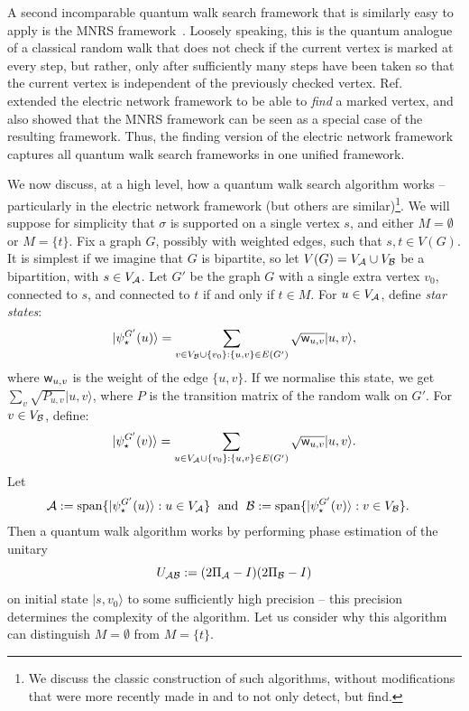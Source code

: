 \documentclass{article}
\def\ket#1{{\lvert}#1\rangle}
\renewcommand{\>}{\rangle}
\newcommand{\<}{\langle}
\renewcommand{\(}{\left(}
\renewcommand{\)}{\right)}
\def\w{{\sf w}}
\begin{document}
A second incomparable quantum walk search framework that is similarly easy to apply is the MNRS framework~\cite{magniez2006SearchQuantumWalk}. Loosely speaking, this is the quantum analogue of a classical random walk that does not check if the current vertex is marked at every step, but rather, only after sufficiently many steps have been taken so that the current vertex is independent of the previously checked vertex. Ref.~\cite{apers2019UnifiedFrameworkQWSearch} extended the electric network framework to be able to \emph{find} a marked vertex, and also showed that the MNRS framework can be seen as a special case of the resulting framework. Thus, the finding version of the electric network framework captures all quantum walk search frameworks in one unified framework. 

We now discuss, at a high level, how a quantum walk search algorithm works -- particularly in the electric network framework (but others are similar)\footnote{We discuss the classic construction of such algorithms, without modifications that were more recently made in \cite{ambainis2019QuadSpeedupFindingMarkedQW} and \cite{apers2019UnifiedFrameworkQWSearch} to not only detect, but find.}. We will suppose for simplicity that $\sigma$ is supported on a single vertex $s$, and either $M=\emptyset$ or $M=\{t\}$. 
Fix a graph $G$, possibly with weighted edges, such that $s,t\in V(G)$. It is simplest if we imagine that $G$ is bipartite, so let $V(G)=V_{\cal A}\cup V_{\cal B}$ be a bipartition, with $s\in V_{\cal A}$. Let $G'$ be the graph $G$ with a single extra vertex $v_0$, connected to $s$, and connected to $t$ if and only if $t\in M$. 
For $u\in V_{\cal A}$, define \emph{star states}:
$$\ket{\psi_\star^{G'}(u)} = \sum_{v\in V_{\cal B}\cup\{v_0\}:\{u,v\}\in E(G')}\sqrt{\w_{u,v}}\ket{u,v},$$
where $\w_{u,v}$ is the weight of the edge $\{u,v\}$. If we normalise this state, we get $\sum_v\sqrt{P_{u,v}}\ket{u,v}$, where $P$ is the transition matrix of the random walk on $G'$. For $v\in V_{\cal B}$, define:
$$\ket{\psi_\star^{G'}(v)} = \sum_{u\in V_{\cal A}\cup\{v_0\}:\{u,v\}\in E(G')}\sqrt{\w_{u,v}}\ket{u,v}.$$
Let
\begin{align*}
{\cal A} &:= \mathrm{span}\{\ket{\psi_\star^{G'}(u)}: u\in V_{\cal A}\}
\;\mbox{ and }\;{\cal B} := \mathrm{span}\{\ket{\psi_\star^{G'}(v)}: v\in V_{\cal B}\}.
\end{align*}
Then a quantum walk algorithm works by performing phase estimation of the unitary 
$$U_{\cal AB}:=(2\Pi_{\cal A}-I)(2\Pi_{\cal B}-I)$$
on initial state $\ket{s,v_0}$ to some sufficiently high precision -- this precision determines the complexity of the algorithm. Let us consider why this algorithm can distinguish $M=\emptyset$ from $M=\{t\}$. 
\end{document}
